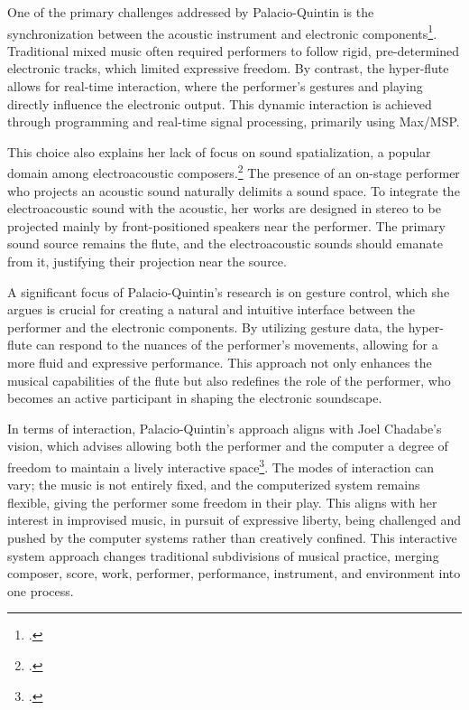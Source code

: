 \documentclass[12pt,twoside,maitrise]{dms_ks}
\theoremstyle{definition}
\begin{document}
{One of the primary challenges addressed by Palacio-Quintin is the synchronization between the acoustic instrument and electronic components\footcite{palacio-quintin_composition_2012-1}. 
Traditional mixed music often required performers to follow rigid, pre-determined electronic tracks, which limited expressive freedom. 
By contrast, the hyper-flute allows for real-time interaction, where the performer's gestures and playing directly influence the electronic output. 
This dynamic interaction is achieved through programming and real-time signal processing, primarily using Max/MSP.

This choice also explains her lack of focus on sound spatialization, a popular domain among electroacoustic composers.\footcite[50]{palacio-quintin_composition_2012-1} 
The presence of an on-stage performer who projects an acoustic sound naturally delimits a sound space. 
To integrate the electroacoustic sound with the acoustic, her works are designed in stereo to be projected mainly by front-positioned speakers near the performer. 
The primary sound source remains the flute, and the electroacoustic sounds should emanate from it, justifying their projection near the source.

A significant focus of Palacio-Quintin's research is on gesture control, which she argues is crucial for creating a natural and intuitive interface between the performer and the electronic components. 
By utilizing gesture data, the hyper-flute can respond to the nuances of the performer's movements, allowing for a more fluid and expressive performance. 
This approach not only enhances the musical capabilities of the flute but also redefines the role of the performer, who becomes an active participant in shaping the electronic soundscape.

In terms of interaction, Palacio-Quintin’s approach aligns with Joel Chadabe's vision, which advises allowing both the performer and the computer a degree of freedom to maintain a lively interactive space\footcite[23]{chadabe_interactive_1984}. 
The modes of interaction can vary; the music is not entirely fixed, and the computerized system remains flexible, giving the performer some freedom in their play. 
This aligns with her interest in improvised music, in pursuit of expressive liberty, being challenged and pushed by the computer systems rather than creatively confined. 
This interactive system approach changes traditional subdivisions of musical practice, merging composer, score, work, performer, performance, instrument, and environment into one process.

}
\end{document}
